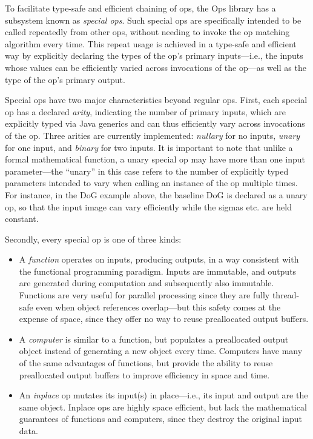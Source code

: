 \documentclass{bmcart}
\begin{document}
To facilitate type-safe and efficient chaining of ops, the Ops library has a
subsystem known as \textit{special ops}. Such special ops are specifically
intended to be called repeatedly from other ops, without needing to invoke the
op matching algorithm every time. This repeat usage is achieved in a type-safe
and efficient way by explicitly declaring the types of the op's primary
inputs---i.e., the inputs whose values can be efficiently varied across
invocations of the op---as well as the type of the op's primary output.

Special ops have two major characteristics beyond regular ops. First, each
special op has a declared \textit{arity}, indicating the number of primary
inputs, which are explicitly typed via Java generics and can thus efficiently
vary across invocations of the op. Three arities are currently implemented:
\textit{nullary} for no inputs, \textit{unary} for one input, and
\textit{binary} for two inputs. It is important to note that unlike a formal
mathematical function, a unary special op may have more than one input
parameter---the ``unary'' in this case refers to the number of explicitly typed
parameters intended to vary when calling an instance of the op multiple times.
For instance, in the DoG example above, the baseline DoG is declared as a unary
op, so that the input image can vary efficiently while the sigmas etc. are held
constant.

Secondly, every special op is one of three kinds:

\begin{itemize}
  \item A \textit{function} operates on inputs, producing outputs, in a way
    consistent with the functional programming paradigm. Inputs are immutable,
    and outputs are generated during computation and subsequently also
    immutable. Functions are very useful for parallel processing since they are
    fully thread-safe even when object references overlap---but this safety
    comes at the expense of space, since they offer no way to reuse
    preallocated output buffers.
  \item A \textit{computer} is similar to a function, but populates a
    preallocated output object instead of generating a new object every time.
    Computers have many of the same advantages of functions, but provide the
    ability to reuse preallocated output buffers to improve efficiency in space
    and time.
  \item An \textit{inplace} op mutates its input(s) in place---i.e., its input
    and output are the same object. Inplace ops are highly space efficient, but
    lack the mathematical guarantees of functions and computers, since they
    destroy the original input data.
\end{itemize}
\end{document}
